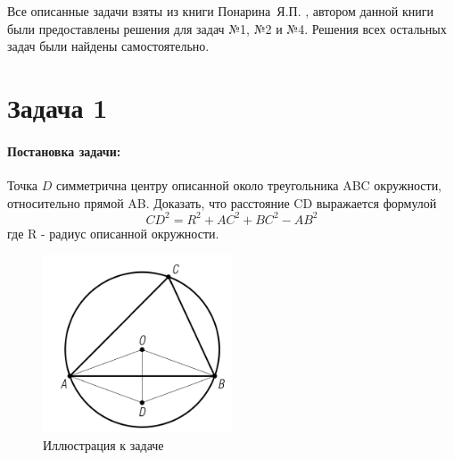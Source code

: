 {
   Все описанные задачи взяты из книги Понарина~Я.П. \cite{book:ponarin}, автором данной книги были предоставлены решения для задач №1, №2 и №4. Решения всех остальных задач были найдены самостоятельно.
   \section*{Задача 1}
   \paragraph{Постановка задачи:}
   Точка \(D\) симметрична центру описанной около треугольника ABC окружности, относительно прямой AB.
   Доказать, что расстояние CD выражается формулой
   \begin{equation}
      CD^2 = R^2 +AC^2 + BC^2 - AB^2
      \label{t1:f1}
   \end{equation}
   где R - радиус описанной окружности.
   \begin{figure}[h]
      \centering
      \includegraphics[width=0.5\textwidth]{images/task1.png}
      \caption{Иллюстрация к задаче}
      \label{t1:im}
   \end{figure}
}
